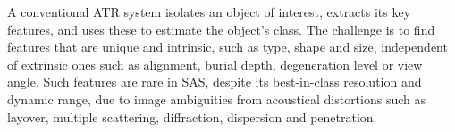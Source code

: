  

A conventional ATR system isolates an object of interest, extracts its key features, and uses these to estimate the object's class. The challenge is to find features that are unique and intrinsic, such as type, shape and size, independent of extrinsic ones such as alignment, burial depth, degeneration level or view angle. Such features are rare in SAS, despite its best-in-class resolution and dynamic range, due to image ambiguities from acoustical distortions such as layover, multiple scattering, diffraction, dispersion and penetration.



%
%




%
%
%

%
%
%
%
%
%

